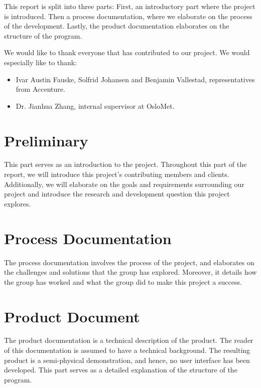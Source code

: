 \documentclass[14pt, a4paper, english]{report}
\begin{document}
	This report is split into three parts: First, an introductory part where the project is introduced. Then a process documentation, where we elaborate on the process of the development. Lastly, the product documentation elaborates on the structure of the program.
	
	We would like to thank everyone that has contributed to our project. We would especially like to thank:
	\begin{itemize}
		\item Ivar Austin Fauske, Solfrid Johansen and Benjamin Vallestad, representatives from Accenture.
		\item Dr. Jianhua Zhang, internal supervisor at OsloMet.
	\end{itemize}
	\part{Preliminary}
	This part serves as an introduction to the project. Throughout this part of the report, we will introduce this project's contributing members and clients. Additionally, we will elaborate on the goals and requirements surrounding our project and introduce the research and development question this project explores.
	
	
	\part{Process Documentation}
	The process documentation involves the process of the project, and elaborates on the challenges and solutions that the group has explored. Moreover, it details how the group has worked and what the group did to make this project a success.
	
	
	
	
	\part{Product Document}
	The product documentation is a technical description of the product. The reader of this documentation is assumed to have a technical background. The resulting product is a semi-physical demonstration, and hence, no user interface has been developed. This part serves as a detailed explanation of the structure of the program. 
	
%	

	
	\clearpage
    \printbibliography
    \appendix
    
    
    
    
\end{document}
